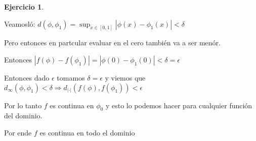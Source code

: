 \documentclass[11pt]{report}
\newcommand{\Ra}{\Rightarrow}
\theoremstyle{definition}
\newtheorem{ej}{Ejercicio}
\begin{document}
\begin{ej}
\begin{enumerate}
					Veamosló: $d(\phi,\phi_1) = \sup_{x\in [0,1] }|\phi(x)-\phi_1 (x)| < \delta$

					Pero entonces en partcular evaluar en el cero también va a ser menór.

					Entonces $|f(\phi) - f(\phi_1)| = |\phi(0) - \phi_1(0)| < \delta = \epsilon $

					Entonces dado $\epsilon$ tomamos $\delta = \epsilon$ y viemos que $d_{\infty}(\phi,\phi_1) < \delta \Ra d_{|\cdot|}(f(\phi),f(\phi_1)) < \epsilon$

					Por lo tanto $f$ es continua en $\phi_0$ y esto lo podemos hacer para cualquier función del dominio.

					Por ende $f$ es continua en todo el dominio					
					
			\end{enumerate}
	\end{ej}
\end{document}
